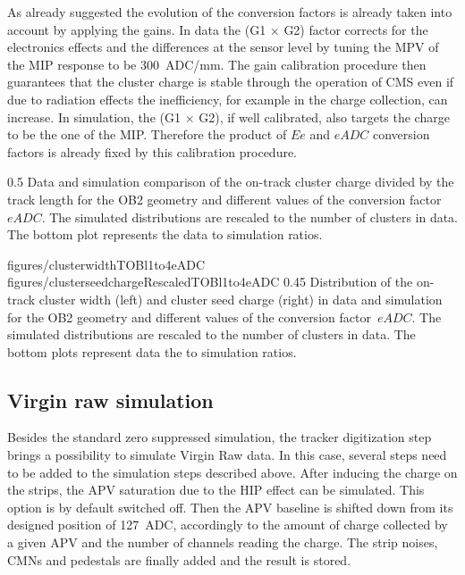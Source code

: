 As already suggested the evolution of the conversion factors is already taken into account by applying the gains. In data the (G1 $\times$ G2) factor corrects for the electronics effects and the differences at the sensor level by tuning the MPV of the MIP response to be 300~ADC/mm. The gain calibration procedure then guarantees that the cluster charge is stable through the operation of CMS even if due to radiation effects the inefficiency, for example in the charge collection, can increase. In simulation, the (G1 $\times$ G2), if well calibrated, also targets the charge to be the one of the MIP. Therefore the product of $Ee$ and $eADC$ conversion factors is already fixed by this calibration procedure. 


                 {0.5}       %
                 { Data and simulation comparison of the on-track cluster charge divided by the track length for the OB2 geometry and different values of the conversion factor~$eADC$. The simulated distributions are rescaled to the number of clusters in data.  The bottom plot represents the data to simulation ratios. }

                 {figures/clusterwidthTOBl1to4eADC}
                 {figures/clusterseedchargeRescaledTOBl1to4eADC} %
                 {0.45}       %
                 { Distribution of the on-track cluster width (left) and cluster seed charge (right) in data and simulation for the OB2 geometry and different values of the conversion factor~$eADC$.  The simulated distributions are rescaled to the number of clusters in data.  The bottom plots represent data the to simulation ratios. }

 
\subsection{Virgin raw simulation~\label{sec:VRsimu}}

Besides the standard zero suppressed simulation, the tracker digitization step brings a possibility to simulate Virgin Raw data. In this case, several steps need to be added to the simulation steps described above. After inducing the charge on the strips, the APV saturation due to the HIP effect can be simulated. This option is by default switched off. Then the APV baseline is shifted down from its designed position of 127~ADC, accordingly to the amount of charge collected by a given APV and the number of channels reading the charge. The strip noises, CMNs and pedestals are finally added and the result is stored.

